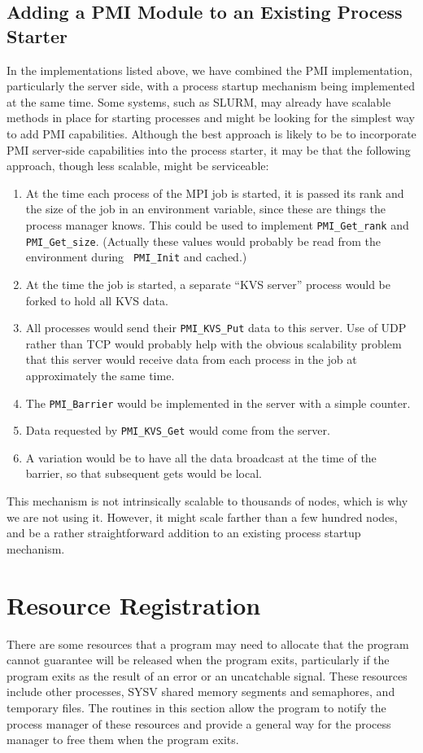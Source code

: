 \documentclass[11pt]{article}
\begin{document}
\subsection{Adding a PMI Module to an Existing Process Starter}
\label{sec:adding}

In the implementations listed above, we have combined the PMI
implementation, particularly the server side, with a process startup
mechanism being implemented at the same time.  Some systems, such as
SLURM, may already have scalable methods in place for starting processes
and might be looking for the simplest way to add PMI capabilities.
Although the best approach is likely to be to incorporate PMI
server-side capabilities into the process starter, it may be that the
following approach, though less scalable, might be serviceable:
\begin{enumerate}
\item At the time each process of the MPI job is started, it is passed
  its rank and the size of the job in an environment variable, since
  these are things the process manager knows.  This could be used to
  implement {\tt PMI\_Get\_rank} and {\tt PMI\_Get\_size}.  (Actually
  these values would probably be read from the environment during {\tt
    PMI\_Init} and cached.)
\item At the time the job is started, a separate ``KVS server'' process
  would be forked to hold all KVS data.
\item All processes would send their {\tt PMI\_KVS\_Put} data to this
  server.  Use of UDP rather than TCP would probably help with the
  obvious scalability problem that this server would receive data from
  each process in the job at approximately the same time.
\item The {\tt PMI\_Barrier} would be implemented in the server with a
  simple counter.
\item Data requested by {\tt PMI\_KVS\_Get} would come from the server.
\item A variation would be to have all the data broadcast at the time of
  the barrier, so that subsequent gets would be local.
\end{enumerate}
This mechanism is not intrinsically scalable to thousands of nodes,
which is why we are not using it.  However, it might scale farther than
a few hundred nodes, and be a rather straightforward addition to an
existing process startup mechanism.

\section{Resource Registration}
\label{sec:register}
There are some resources that a program may need to allocate that the
program cannot guarantee will be released when the program exits,
particularly if the program exits as the result of an error or an
uncatchable signal.  These resources include other processes, SYSV
shared memory segments and semaphores, and temporary files.  The
routines in this section allow the program to notify the process
manager of these resources and provide a general way for the process
manager to free them when the program exits.  
\end{document}
